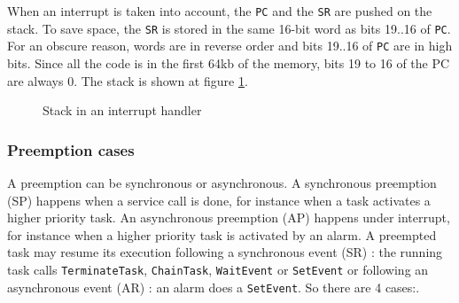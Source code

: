 \documentclass[11pt, oneside]{article}   	%
\begin{document}
When an interrupt is taken into account, the \lstinline{PC} and the \lstinline{SR} are pushed on the stack. To save space, the \lstinline{SR} is stored in the same 16-bit word as bits 19..16 of \lstinline{PC}. For an obscure reason, words are in reverse order and bits 19..16 of \lstinline{PC} are in high bits. Since all the code is in the first 64kb of the memory, bits 19 to 16 of the PC are always 0. The stack is shown at figure \ref{fig:stackit}.

\begin{figure}[h]
\caption{Stack in an interrupt handler}
\centering
\vspace{1em}
\label{fig:stackit}
\end{figure}

\subsubsection*{Preemption cases}

A preemption can be synchronous or asynchronous. A synchronous preemption (SP) happens when a service call is done, for instance when a task activates a higher priority task. An asynchronous preemption (AP) happens under interrupt, for instance when a higher priority task is activated by an alarm. A preempted task may resume its execution following a synchronous event (SR) : the running task calls \lstinline{TerminateTask}, \lstinline{ChainTask}, \lstinline{WaitEvent} or \lstinline{SetEvent} or following an asynchronous event (AR) : an alarm does a \lstinline{SetEvent}. So there are 4 cases:.
\end{document}
